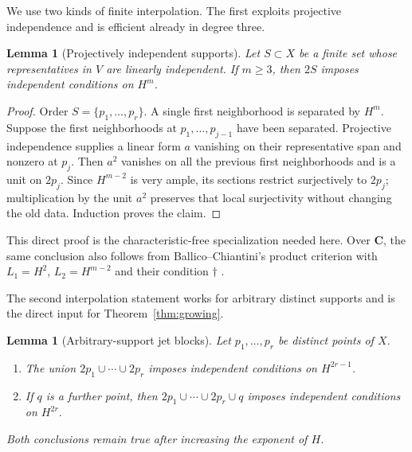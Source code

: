 \documentclass[11pt]{article}
\newtheorem{lemma}[theorem]{Lemma}
\newcommand{\CC}{\mathbf C}
\begin{document}
We use two kinds of finite interpolation.  The first exploits projective
independence and is efficient already in degree three.

\begin{lemma}[Projectively independent supports]\label{lem:projective-blocks}
Let $S\subset X$ be a finite set whose representatives in $V$ are linearly
independent.  If $m\geq3$, then $2S$ imposes independent conditions on $H^m$.
\end{lemma}

\begin{proof}
Order $S=\{p_1,\ldots,p_r\}$.  A single first neighborhood is separated by
$H^m$.  Suppose the first neighborhoods at
$p_1,\ldots,p_{j-1}$ have been separated.  Projective independence supplies
a linear form $a$ vanishing on their representative span and nonzero at
$p_j$.  Then $a^2$ vanishes on all the previous first neighborhoods and is a
unit on $2p_j$.  Since $H^{m-2}$ is very ample, its sections restrict
surjectively to $2p_j$; multiplication by the unit $a^2$ preserves that local
surjectivity without changing the old data.  Induction proves the claim.
\end{proof}

This direct proof is the characteristic-free specialization needed here.
Over $\CC$, the same conclusion also follows from Ballico--Chiantini's
product criterion with $L_1=H^2$, $L_2=H^{m-2}$ and their condition
$\dagger$ \cite[Definition~3.1 and Theorem~3.5]{BallicoChiantini2021}.

The second interpolation statement works for arbitrary distinct supports and
is the direct input for Theorem~\ref{thm:growing}.

\begin{lemma}[Arbitrary-support jet blocks]\label{lem:arbitrary-blocks}
Let $p_1,\ldots,p_r$ be distinct points of $X$.
\begin{enumerate}[label=(\roman*)]
\item The union $2p_1\cup\cdots\cup2p_r$ imposes independent conditions on
$H^{2r-1}$.
\item If $q$ is a further point, then
$2p_1\cup\cdots\cup2p_r\cup q$ imposes independent conditions on $H^{2r}$.
\end{enumerate}
Both conclusions remain true after increasing the exponent of $H$.
\end{lemma}
\end{document}
